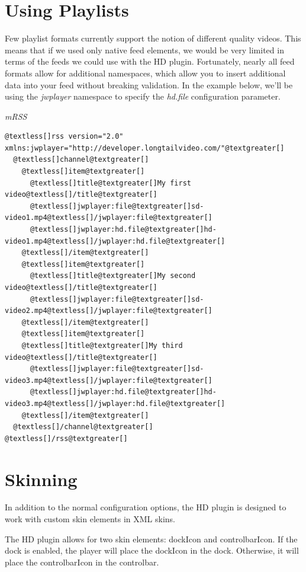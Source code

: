 \documentclass[letterpaper,10pt,english]{sphinxmanual}
\begin{document}
\section{Using Playlists}
\label{index:using-playlists}
Few playlist formats currently support the notion of different quality videos. This means that if we used only native feed elements, we would be very limited in terms of the feeds we could use with the HD plugin. Fortunately, nearly all feed formats allow for additional namespaces, which allow you to insert additional data into your feed without breaking validation. In the example below, we'll be using the \emph{jwplayer} namespace to specify the \emph{hd.file} configuration parameter.

\emph{mRSS}

\begin{Verbatim}[commandchars=@\[\]]
@textless[]rss version="2.0" xmlns:jwplayer="http://developer.longtailvideo.com/"@textgreater[]
  @textless[]channel@textgreater[]
    @textless[]item@textgreater[]
      @textless[]title@textgreater[]My first video@textless[]/title@textgreater[]
      @textless[]jwplayer:file@textgreater[]sd-video1.mp4@textless[]/jwplayer:file@textgreater[]
      @textless[]jwplayer:hd.file@textgreater[]hd-video1.mp4@textless[]/jwplayer:hd.file@textgreater[]
    @textless[]/item@textgreater[]
    @textless[]item@textgreater[]
      @textless[]title@textgreater[]My second video@textless[]/title@textgreater[]
      @textless[]jwplayer:file@textgreater[]sd-video2.mp4@textless[]/jwplayer:file@textgreater[]
    @textless[]/item@textgreater[]
    @textless[]item@textgreater[]
    @textless[]title@textgreater[]My third video@textless[]/title@textgreater[]
      @textless[]jwplayer:file@textgreater[]sd-video3.mp4@textless[]/jwplayer:file@textgreater[]
      @textless[]jwplayer:hd.file@textgreater[]hd-video3.mp4@textless[]/jwplayer:hd.file@textgreater[]
    @textless[]/item@textgreater[]
  @textless[]/channel@textgreater[]
@textless[]/rss@textgreater[]
\end{Verbatim}


\section{Skinning}
\label{index:skinning}
In addition to the normal configuration options, the HD plugin is designed to work with custom skin elements in XML skins.

The HD plugin allows for two skin elements: dockIcon and controlbarIcon. If the dock is enabled, the player will place the dockIcon in the dock. Otherwise, it will place the controlbarIcon in the controlbar.
\end{document}
